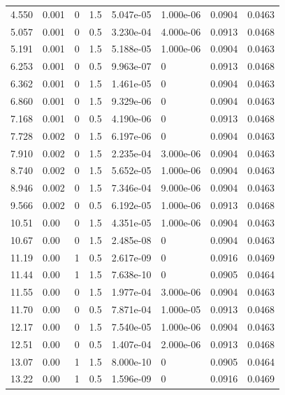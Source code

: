 \documentclass[preview]{standalone}
\begin{document}
{{\begin{tabular}{L{1.2cm}C{1.2cm} C{0.3cm}C{0.5cm} C{1.4cm}C{1.4cm} C{1.4cm}C{1.4cm}}
  4.550  &  0.001  & 0     & 1.5 &  5.047e-05  & 1.000e-06  & 0.0904 &  0.0463   \\ 
  5.057  &  0.001  & 0     & 0.5 &  3.230e-04  & 4.000e-06  & 0.0913 &  0.0468   \\ 
  5.191  &  0.001  & 0     & 1.5 &  5.188e-05  & 1.000e-06  & 0.0904 &  0.0463   \\ 
  6.253  &  0.001  & 0     & 0.5 &  9.963e-07  & 0  & 0.0913 &  0.0468   \\ 
  6.362  &  0.001  & 0     & 1.5 &  1.461e-05  & 0  & 0.0904 &  0.0463   \\ 
  6.860  &  0.001  & 0     & 1.5 &  9.329e-06  & 0  & 0.0904 &  0.0463   \\ 
  7.168  &  0.001  & 0     & 0.5 &  4.190e-06  & 0  & 0.0913 &  0.0468   \\ 
  7.728  &  0.002  & 0     & 1.5 &  6.197e-06  & 0  & 0.0904 &  0.0463   \\ 
  7.910  &  0.002  & 0     & 1.5 &  2.235e-04  & 3.000e-06  & 0.0904 &  0.0463   \\ 
  8.740  &  0.002  & 0     & 1.5 &  5.652e-05  & 1.000e-06  & 0.0904 &  0.0463   \\ 
  8.946  &  0.002  & 0     & 1.5 &  7.346e-04  & 9.000e-06  & 0.0904 &  0.0463   \\ 
  9.566  &  0.002  & 0     & 0.5 &  6.192e-05  & 1.000e-06  & 0.0913 &  0.0468   \\ 
  10.51  &  0.00  & 0     & 1.5 &  4.351e-05  & 1.000e-06  & 0.0904 &  0.0463   \\ 
  10.67  &  0.00  & 0     & 1.5 &  2.485e-08  & 0  & 0.0904 &  0.0463   \\ 
  11.19  &  0.00  & 1     & 0.5 &  2.617e-09  & 0  & 0.0916 &  0.0469   \\ 
  11.44  &  0.00  & 1     & 1.5 &  7.638e-10  & 0  & 0.0905 &  0.0464   \\ 
  11.55  &  0.00  & 0     & 1.5 &  1.977e-04  & 3.000e-06  & 0.0904 &  0.0463   \\ 
  11.70  &  0.00  & 0     & 0.5 &  7.871e-04  & 1.000e-05  & 0.0913 &  0.0468   \\ 
  12.17  &  0.00  & 0     & 1.5 &  7.540e-05  & 1.000e-06  & 0.0904 &  0.0463   \\ 
  12.51  &  0.00  & 0     & 0.5 &  1.407e-04  & 2.000e-06  & 0.0913 &  0.0468   \\ 
  13.07  &  0.00  & 1     & 1.5 &  8.000e-10  & 0  & 0.0905 &  0.0464   \\ 
  13.22  &  0.00  & 1     & 0.5 &  1.596e-09  & 0  & 0.0916 &  0.0469   \\ 

\end{tabular}}}
\end{document}
